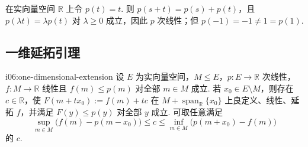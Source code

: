 \begin{FAExample}[非对称次线性泛函]
在实向量空间 \(\displaystyle \mathbb R\) 上令 \(\displaystyle p(t)=t\). 则 \(\displaystyle p(s+t)=p(s)+p(t)\)，且 \(\displaystyle p(\lambda t)=\lambda p(t)\) 对 \(\displaystyle \lambda\geqslant0\) 成立，因此 \(\displaystyle p\) 次线性；但 \(\displaystyle p(-1)=-1\neq1=p(1)\).
\end{FAExample}

\subsection{一维延拓引理}

\begin{FALemma}[B][一维受控延拓]{i06:one-dimensional-extension}
设 \(\displaystyle E\) 为实向量空间，\(\displaystyle M\leqslant E\)，\(\displaystyle p:E\to\mathbb R\) 次线性，\(\displaystyle f:M\to\mathbb R\) 线性且 \(\displaystyle f(m)\leqslant p(m)\) 对全部 \(\displaystyle m\in M\) 成立. 若 \(\displaystyle x_0\in E\setminus M\)，则存在 \(\displaystyle c\in\mathbb R\)，使 \(\displaystyle F(m+t x_0):=f(m)+tc\)
在 \(\displaystyle M+\operatorname{span}_{\mathbb R}\{x_0\}\) 上良定义、线性、延拓 \(\displaystyle f\)，并满足 \(\displaystyle F(y)\leqslant p(y)\) 对全部 \(\displaystyle y\) 成立. 可取任意满足
\[
\sup_{m\in M}\bigl(f(m)-p(m-x_0)\bigr)
\leqslant c
\leqslant
\inf_{m\in M}\bigl(p(m+x_0)-f(m)\bigr)
\]
的 \(\displaystyle c\).
\end{FALemma}

